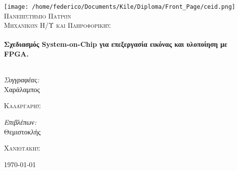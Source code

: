 \begin{titlepage}

\begin{center}


\texttt{[image: /home/federico/Documents/Kile/Diploma/Front\_Page/ceid.png]}\\[1cm]    
\textsc{\LARGE Πανεπιστήμιο Πατρών}\\[1.5cm]

\textsc{\Large Μηχανικών Η/Υ και Πληροφορικής}\\[2.5cm]


\HRule \\[0.4cm]
{ \Large \bfseries Σχεδιασμός System-on-Chip για επεξεργασία εικόνας και υλοποίηση με FPGA. }\\[0.4cm]

\HRule \\[5.5cm]

\begin{minipage}{0.4\textwidth}
\begin{flushleft} \large
\emph{Συγγραφέας:}\\
Χαράλαμπος 

\textsc{Καλάργαρης}
\end{flushleft}
\end{minipage}
\begin{minipage}{0.4\textwidth}
\begin{flushright} \large
\emph{Επιβλέπων:} \\
Θεμιστοκλής 

\textsc{Χανιωτάκης}

\end{flushright}
\end{minipage}

\vfill

{\large \today}

\end{center}

\end{titlepage}